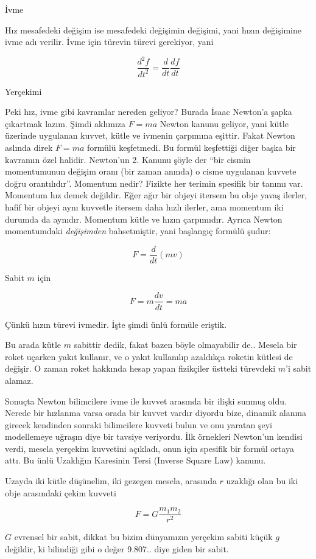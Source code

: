 \documentclass[12pt,fleqn]{article}\usepackage{../../common}
\begin{document}
İvme

Hız mesafedeki değişim ise mesafedeki değişimin değişimi, yani hızın
değişimine ivme adı verilir. İvme için türevin türevi gerekiyor, yani 

$$ \frac{d^2f}{dt^2} = \frac{d}{dt} \frac{df}{dt} $$

Yerçekimi

Peki hız, ivme gibi kavramlar nereden geliyor? Burada İsaac Newton'a şapka
çıkartmak lazım. Şimdi aklımıza $F = ma$ Newton kanunu geliyor, yani kütle
üzerinde uygulanan kuvvet, kütle ve ivmenin çarpımına eşittir. Fakat Newton
aslında direk $F=ma$ formülü keşfetmedi. Bu formül keşfettiği diğer başka
bir kavramın özel halidir. Newton'un 2. Kanunu şöyle der ``bir cismin
momentumunun değişim oranı (bir zaman anında) o cisme uygulanan kuvvete
doğru orantılıdır''. Momentum nedir? Fizikte her terimin spesifik bir
tanımı var. Momentum hız demek değildir. Eğer ağır bir objeyi itersem bu
obje yavaş ilerler, hafif bir objeyi aynı kuvvetle itersem daha hızlı
ilerler, ama momentum iki durumda da aynıdır. Momentum kütle ve hızın
çarpımıdır. Ayrıca Newton momentumdaki {\em değişimden} bahsetmiştir, yani
başlangıç formülü şudur:

$$ F = \frac{d}{dt} (mv)$$

Sabit $m$ için

$$ F = m \frac{dv}{dt} = ma$$

Çünkü hızın türevi ivmedir. İşte şimdi ünlü formüle eriştik. 

Bu arada kütle $m$ sabittir dedik, fakat bazen böyle olmayabilir
de.. Mesela bir roket uçarken yakıt kullanır, ve o yakıt kullanılıp
azaldıkça roketin kütlesi de değişir. O zaman roket hakkında hesap yapan
fizikçiler üstteki türevdeki $m$'i sabit alamaz.

Sonuçta Newton bilimcilere ivme ile kuvvet arasında bir ilişki sunmuş
oldu. Nerede bir hızlanma varsa orada bir kuvvet vardır diyordu bize,
dinamik alanına girecek kendinden sonraki bilimcilere kuvveti bulun ve onu
yaratan şeyi modellemeye uğraşın diye bir tavsiye veriyordu. İlk örnekleri
Newton'un kendisi verdi, mesela yerçekim kuvvetini açıkladı, onun için
spesifik bir formül ortaya attı. Bu ünlü Uzaklığın Karesinin Tersi (Inverse
Square Law) kanunu.

Uzayda iki kütle düşünelim, iki gezegen mesela, arasında $r$ uzaklığı olan
bu iki obje arasındaki çekim kuvveti

$$ F = G \frac{m_1m_2}{r^2}$$

$G$ evrensel bir sabit, dikkat bu bizim dünyamızın yerçekim sabiti küçük
$g$ değildir, ki bilindiği gibi o değer 9.807.. diye giden bir sabit.
\end{document}
